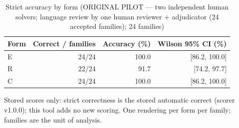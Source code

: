 \begin{table}[t]
\centering
\small
\caption{Strict accuracy by form (ORIGINAL PILOT --- two independent human solvers; language review by one human reviewer + adjudicator (24 accepted families); 24 families)}
\label{tab:pilotorig-Qwen3-4B-accuracy}
\begin{tabular}{lrrr}
\toprule
Form & Correct / families & Accuracy (\%) & Wilson 95\% CI (\%) \\
\midrule
E & 24/24 & 100.0 & [86.2, 100.0] \\
R & 22/24 & 91.7 & [74.2, 97.7] \\
C & 24/24 & 100.0 & [86.2, 100.0] \\
\bottomrule
\end{tabular}
\par\smallskip
\parbox{\linewidth}{\footnotesize Stored scores only: strict correctness is the stored automatic correct (scorer v1.0.0); this tool adds no new scoring. One rendering per form per family; families are the unit of analysis.}
\end{table}
